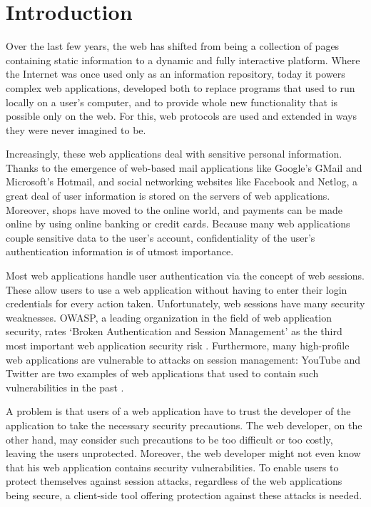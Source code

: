 \chapter{Introduction}

Over the last few years, the web has shifted from being a collection of pages containing static information to a dynamic and fully interactive platform. Where the Internet was once used only as an information repository, today it powers complex web applications, developed both to replace programs that used to run locally on a user's computer, and to provide whole new functionality that is possible only on the web. For this, web protocols are used and extended in ways they were never imagined to be.

Increasingly, these web applications deal with sensitive personal information. Thanks to the emergence of web-based mail applications like Google's GMail and Microsoft's Hotmail, and social networking websites like Facebook and Netlog, a great deal of user information is stored on the servers of web applications. Moreover, shops have moved to the online world, and payments can be made online by using online banking or credit cards. Because many web applications couple sensitive data to the user's account, confidentiality of the user's authentication information is of utmost importance.

Most web applications handle user authentication via the concept of web sessions. These allow users to use a web application without having to enter their login credentials for every action taken. Unfortunately, web sessions have many security weaknesses. OWASP, a leading organization in the field of web application security, rates `Broken Authentication and Session Management' as the third most important web application security risk \cite{Williams2010}. Furthermore, many high-profile web applications are vulnerable to attacks on session management: YouTube and Twitter are two examples of web applications that used to contain such vulnerabilities in the past \cite{youtubevulnerability,twittervulnerability}.

A problem is that users of a web application have to trust the developer of the application to take the necessary security precautions. The web developer, on the other hand, may consider such precautions to be too difficult or too costly, leaving the users unprotected. Moreover, the web developer might not even know that his web application contains security vulnerabilities. To enable users to protect themselves against session attacks, regardless of the web applications being secure, a client-side tool offering protection against these attacks is needed.

